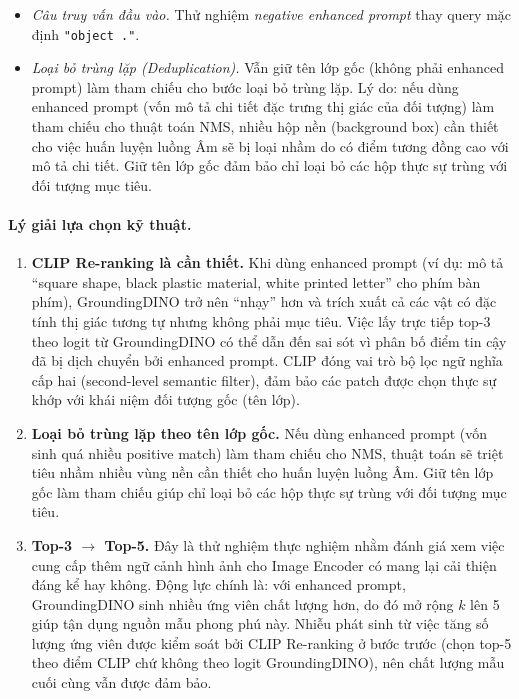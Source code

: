 \documentclass[a4paper,12pt]{report}
\numberwithin{figure}{chapter}
\numberwithin{table}{chapter}
\begin{document}
\begin{itemize}
    \item \textit{Câu truy vấn đầu vào.} Thử nghiệm \emph{negative enhanced prompt} thay query mặc định \texttt{"object ."}.
    \item \textit{Loại bỏ trùng lặp (Deduplication).} Vẫn giữ tên lớp gốc (không phải enhanced prompt) làm tham chiếu cho bước loại bỏ trùng lặp. Lý do: nếu dùng enhanced prompt (vốn mô tả chi tiết đặc trưng thị giác của đối tượng) làm tham chiếu cho thuật toán NMS, nhiều hộp nền (background box) cần thiết cho việc huấn luyện luồng Âm sẽ bị loại nhầm do có điểm tương đồng cao với mô tả chi tiết. Giữ tên lớp gốc đảm bảo chỉ loại bỏ các hộp thực sự trùng với đối tượng mục tiêu.
\end{itemize}



\paragraph{Lý giải lựa chọn kỹ thuật.}
\begin{enumerate}
    \item \textbf{CLIP Re-ranking là cần thiết.} Khi dùng enhanced prompt (ví dụ: mô tả ``square shape, black plastic material, white printed letter'' cho phím bàn phím), GroundingDINO trở nên ``nhạy'' hơn và trích xuất cả các vật có đặc tính thị giác tương tự nhưng không phải mục tiêu. Việc lấy trực tiếp top-3 theo logit từ GroundingDINO có thể dẫn đến sai sót vì phân bố điểm tin cậy đã bị dịch chuyển bởi enhanced prompt. CLIP đóng vai trò bộ lọc ngữ nghĩa cấp hai (second-level semantic filter), đảm bảo các patch được chọn thực sự khớp với khái niệm đối tượng gốc (tên lớp).
    \item \textbf{Loại bỏ trùng lặp theo tên lớp gốc.} Nếu dùng enhanced prompt (vốn sinh quá nhiều positive match) làm tham chiếu cho NMS, thuật toán sẽ triệt tiêu nhầm nhiều vùng nền cần thiết cho huấn luyện luồng Âm. Giữ tên lớp gốc làm tham chiếu giúp chỉ loại bỏ các hộp thực sự trùng với đối tượng mục tiêu.
    \item \textbf{Top-3 $\to$ Top-5.} Đây là thử nghiệm thực nghiệm nhằm đánh giá xem việc cung cấp thêm ngữ cảnh hình ảnh cho Image Encoder có mang lại cải thiện đáng kể hay không. Động lực chính là: với enhanced prompt, GroundingDINO sinh nhiều ứng viên chất lượng hơn, do đó mở rộng $k$ lên 5 giúp tận dụng nguồn mẫu phong phú này. Nhiễu phát sinh từ việc tăng số lượng ứng viên được kiểm soát bởi CLIP Re-ranking ở bước trước (chọn top-5 theo điểm CLIP chứ không theo logit GroundingDINO), nên chất lượng mẫu cuối cùng vẫn được đảm bảo.
\end{enumerate}
\end{document}

